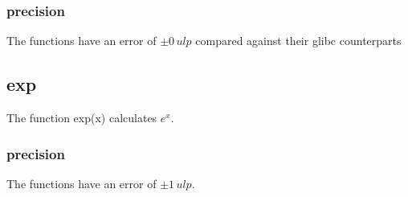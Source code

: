 \documentclass[12pt]{article}
\numberwithin{equation}{subsection}
\begin{document}
\subsubsection{precision}
The functions have an error of $ \pm 0\, ulp$ compared against their glibc
counterparts

\subsection{exp}
\label{sub_sec:exp}
The function exp(x) calculates $ e^x $.

\subsubsection{precision}
The functions have an error of $ \pm 1\, ulp$.
\end{document}
